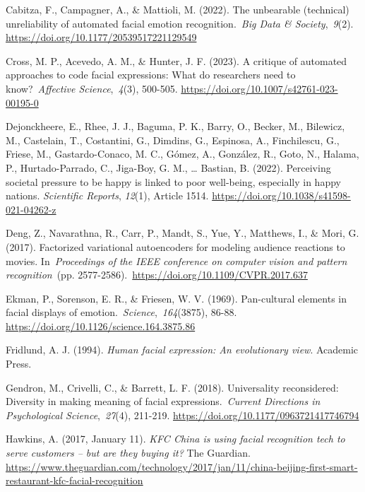 \documentclass[authordate, reflection]{jote-new-article}
\begin{document}
	Cabitza, F., Campagner, A., \& Mattioli, M. (2022). The unbearable (technical) unreliability of automated facial emotion recognition. \emph{Big Data \& Society}, \emph{9}(2). \url{https://doi.org/10.1177/20539517221129549}



	Cross, M. P., Acevedo, A. M., \& Hunter, J. F. (2023). A critique of automated approaches to code facial expressions: What do researchers need to know? \emph{Affective Science}, \emph{4}(3), 500-505. \url{https://doi.org/10.1007/s42761-023-00195-0}



	Dejonckheere, E., Rhee, J. J., Baguma, P. K., Barry, O., Becker, M., Bilewicz, M., Castelain, T., Costantini, G., Dimdins, G., Espinosa, A., Finchilescu, G., Friese, M., Gastardo-Conaco, M. C., Gómez, A., González, R., Goto, N., Halama, P., Hurtado-Parrado, C., Jiga-Boy, G. M., … Bastian, B. (2022). Perceiving societal pressure to be happy is linked to poor well-being, especially in happy nations. \emph{Scientific Reports}, \emph{12}(1), Article 1514. \url{https://doi.org/10.1038/s41598-021-04262-z}



	Deng, Z., Navarathna, R., Carr, P., Mandt, S., Yue, Y., Matthews, I., \& Mori, G. (2017). Factorized variational autoencoders for modeling audience reactions to movies. In \emph{Proceedings of the IEEE conference on computer vision and pattern recognition} (pp. 2577-2586). \url{https://doi.org/10.1109/CVPR.2017.637}



	Ekman, P., Sorenson, E. R., \& Friesen, W. V. (1969). Pan-cultural elements in facial displays of emotion. \emph{Science}, \emph{164}(3875), 86-88. \url{https://doi.org/10.1126/science.164.3875.86}



	Fridlund, A. J. (1994). \emph{Human facial expression: An evolutionary view}. Academic Press.



	Gendron, M., Crivelli, C., \& Barrett, L. F. (2018). Universality reconsidered: Diversity in making meaning of facial expressions. \emph{Current Directions in Psychological Science}, \emph{27}(4), 211-219. \url{https://doi.org/10.1177/0963721417746794}



	Hawkins, A. (2017, January 11). \emph{KFC China is using facial recognition tech to serve } \emph{customers -- but are they buying it?} The Guardian. \url{https://www.theguardian.com/technology/2017/jan/11/china-beijing-first-smart-restaurant-kfc-facial-recognition}
\end{document}
